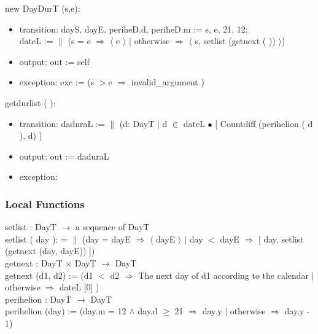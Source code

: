 \documentclass[12pt, titlepage]{article}
\begin{document}
\noindent  new DayDurT (s,e):
\begin{itemize}
\item transition:  dayS, dayE, periheD.d,  periheD.m := s, e, 21, 12;\\

dateL := $\|$ (s = e $\Rightarrow$ $\langle$ e $\rangle$ $|$ otherwise $\Rightarrow$ $\langle$ s, setlist (getnext ( )) $\rangle$) 
\item output: out := self
\item exception: exc := (s $>$e $\Rightarrow$ invalid\_argument )
\end{itemize}

\noindent  getdurlist ( ):
\begin{itemize}
\item transition: daduraL := $\|$ (d: DayT $|$ d $\in$ dateL  $\bullet$ [ Countdiff (perihelion ( d ), d) ]
\item output: out := daduraL
\item exception:
\end{itemize}


\subsubsection{Local Functions}
setlist : DayT $\rightarrow $ a sequence of DayT\\
setlist ( day ): = $\|$ (day = dayE $\Rightarrow$ $\langle$ dayE $\rangle$ $|$ day $<$ dayE $\Rightarrow$ [ day, setlist (getnext (day,  dayE)) ]) \\

getnext : DayT $\times$ DayT $\rightarrow $ DayT\\
getnext (d1, d2) := (d1 $<$ d2 $\Rightarrow$ The next day of d1 according to the calendar $|$ otherwise $\Rightarrow$ dateL [0] )\\

perihelion : DayT $\rightarrow $ DayT\\
perihelion (day) :=  (day.m = 12 $	\wedge$ day.d $\geq	$ 21 $\Rightarrow$  day.y $|$ otherwise $\Rightarrow$  day.y - 1)\\
\end{document}
